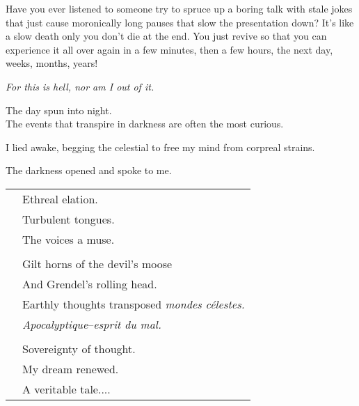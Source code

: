 Have you ever listened to someone try to spruce up
a boring talk with stale jokes that just cause
moronically long pauses that slow the presentation
down?  It's like a slow death only you don't die at
the end.  You just revive so that you can experience
it all over again in a few minutes, then a few hours,
the next day, \large{}weeks, \Large{}months, \LARGE{}years!\normalsize
\VV


\textit{For this is hell, nor am I out of it.}
\VV


\VV


%
%
%


\noindent
The day spun into night. \\
The events that transpire in darkness are often the most curious.
\VV


\noindent
I lied awake, begging the celestial to free my mind from corpreal strains.
\VV


\noindent
The darkness opened and spoke to me.
\VV


\begin{tabular}{ll}
& Ethreal elation. \\
& Turbulent tongues. \\
& The voices a muse. \\
&\\
& Gilt horns of the devil's moose \\
& And Grendel's rolling head. \\
& Earthly thoughts transposed \textit{mondes c{\'e}lestes.} \\
& \textit{Apocalyptique}--\textit{esprit du mal.} \\
&\\
& Sovereignty of thought. \\
& My dream renewed. \\
& A veritable tale.... \\
\end{tabular}


